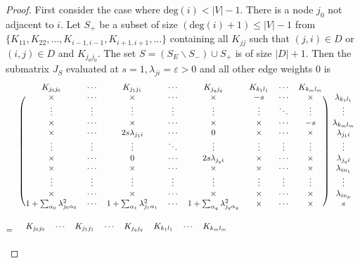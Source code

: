 \documentclass[12pt,reqno]{amsart}
\theoremstyle{plain}
\theoremstyle{definition}
\begin{document}
\begin{proof}
First consider the case where $\text{deg}(i)<|V|-1$. 
There is a node $j_0$ not adjacent to $i$. Let $S_+$ be a subset of size $(\text{deg}(i)+1)\leq |V|-1$ from $\{K_{11},K_{22},\ldots, K_{i-1,i-1},K_{i+1,i+1},\ldots\}$ containing all $K_{jj}$ such that $(j,i)\in D$ or $(i,j)\in D$ and $K_{j_0 j_0}$. The set $S=(S_E\backslash S_-)\cup S_+$ is of size $|D|+1$. Then the submatrix $J_S$ evaluated at $s=1, \lambda_{ji}=\varepsilon>0$ and all other edge weights $0$ is
\begin{align}\label{ranklb_mat}
&\begin{blockarray}{ccccccccc}
K_{j_{0}j_{0}} &\cdots & K_{j_{1}j_{1}} & \cdots & K_{j_{q}j_{q}} & K_{k_{1}l_{1}} & \cdots & K_{k_m l_m}\\
\begin{block}{(cccccccc)c}
  \times & \cdots & \times & \cdots & \times & -s &\cdots & \times & \lambda_{k_1 l_1} \\
  \vdots & \vdots & \vdots & \vdots & \vdots & \vdots &\ddots &\vdots & \vdots \\
  \times & \cdots & \times & \cdots & \times &\times & \cdots &-s & \lambda_{k_m l_m} \\
  \times & \cdots & 2s\lambda_{j_{1}i} & \cdots & 0 & \times & \cdots &\times & \lambda_{j_1 i}\\
  \vdots & \vdots & \vdots & \ddots & \vdots & \vdots & \vdots & \vdots & \vdots \\
  \times & \cdots & 0 & \cdots & 2s\lambda_{j_{q}i} & \times &\cdots &\times & \lambda_{j_q i} \\
  \times & \cdots & \times & \cdots & \times &\times & \cdots & \times & \lambda_{i n_1}\\
  \vdots & \vdots & \vdots & \vdots & \vdots &\vdots & \vdots & \vdots & \vdots\\
  \times & \cdots & \times & \cdots & \times &\times & \cdots & \times  & \lambda_{i n_p}\\
  1+\sum_{\alpha_0}\lambda_{j_{0}\alpha_{0}}^2 & \cdots & 1+\sum_{\alpha_1}\lambda_{j_{1}\alpha_{1}}^2 & \cdots & 1+\sum_{\alpha_q}\lambda_{j_{q}\alpha_{q}}^2 & \times &\cdots & \times & s\\
\end{block}
\end{blockarray}
\nonumber\\
=\quad &\begin{blockarray}{ccccccccc}
K_{j_{0}j_{0}} &\cdots & K_{j_{1}j_{1}} & \cdots & K_{j_{q}j_{q}} & K_{k_{1}l_{1}} & \cdots & K_{k_{m}l_{m}}\\

\end{blockarray}
\end{align}
\end{proof}
\end{document}

